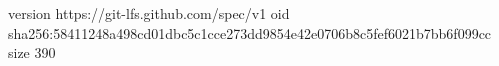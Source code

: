 version https://git-lfs.github.com/spec/v1
oid sha256:58411248a498cd01dbc5c1cce273dd9854e42e0706b8c5fef6021b7bb6f099cc
size 390
